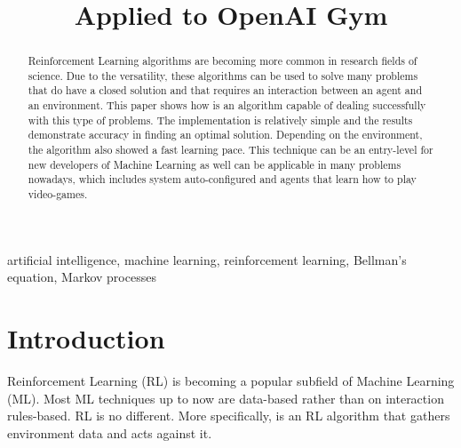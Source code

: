 \documentclass[conference]{IEEEtran}
\begin{document}
\title{{\QLearning} Applied to OpenAI Gym}
\author{
}
\maketitle


\begin{abstract}
    Reinforcement Learning algorithms are becoming more common in research fields of science.
    Due to the versatility, these algorithms can be used to solve many problems that do have a closed solution and that requires an interaction between an agent and an environment.
    This paper shows how {\Qlearning} is an algorithm capable of dealing successfully with this type of problems.
    The implementation is relatively simple and the results demonstrate accuracy in finding an optimal solution.
    Depending on the environment, the algorithm also showed a fast learning pace.
    This technique can be an entry-level for new developers of Machine Learning as well can be applicable in many problems nowadays, which includes system auto-configured and agents that learn how to play video-games.
\end{abstract}

\begin{IEEEkeywords}
    artificial intelligence, machine learning, reinforcement learning, Bellman's equation, Markov processes
\end{IEEEkeywords}


\section{Introduction}

Reinforcement Learning (RL) is becoming a popular subfield of Machine Learning (ML).
Most ML techniques up to now are data-based rather than on interaction rules-based.
RL is no different.
More specifically, {\Qlearning} is an RL algorithm that gathers environment data and acts against it.
\end{document}
